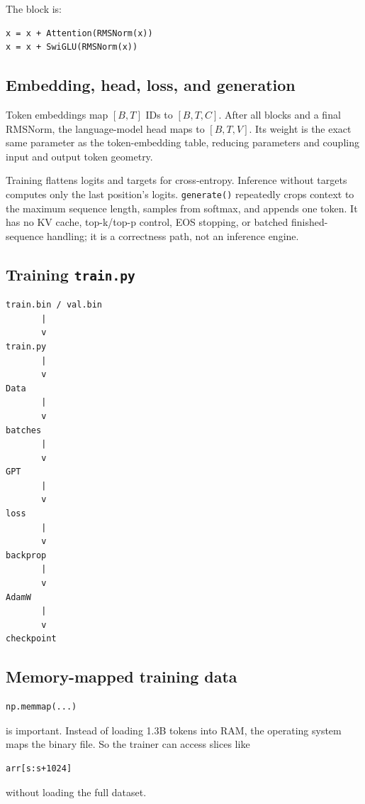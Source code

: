 The block is:
\begin{lstlisting}[style=shadedpython]
x = x + Attention(RMSNorm(x))
x = x + SwiGLU(RMSNorm(x))
\end{lstlisting}

\subsection{Embedding, head, loss, and generation}

Token embeddings map \([B,T]\) IDs to \([B,T,C]\). After all blocks and a final
RMSNorm, the language-model head maps to \([B,T,V]\). Its weight is the exact
same parameter as the token-embedding table, reducing parameters and coupling
input and output token geometry.

Training flattens logits and targets for cross-entropy. Inference without
targets computes only the last position's logits. \texttt{generate()} repeatedly
crops context to the maximum sequence length, samples from softmax, and appends
one token. It has no KV cache, top-k/top-p control, EOS stopping, or batched
finished-sequence handling; it is a correctness path, not an inference engine.

\subsection{Training \texttt{train.py}}

\begin{lstlisting}[style=shadedpython,language={},basicstyle=\scriptsize\ttfamily]
train.bin / val.bin
       |
       v
train.py
       |
       v
Data
       |
       v
batches
       |
       v
GPT
       |
       v
loss
       |
       v
backprop
       |
       v
AdamW
       |
       v
checkpoint
\end{lstlisting}

\subsection{Memory-mapped training data}

\begin{lstlisting}[style=shadedpython]
np.memmap(...)
\end{lstlisting}
is important. Instead of loading 1.3B tokens into RAM, the operating system
maps the binary file. So the trainer can access slices like
\begin{lstlisting}[style=shadedpython]
arr[s:s+1024]
\end{lstlisting}
without loading the full dataset.

